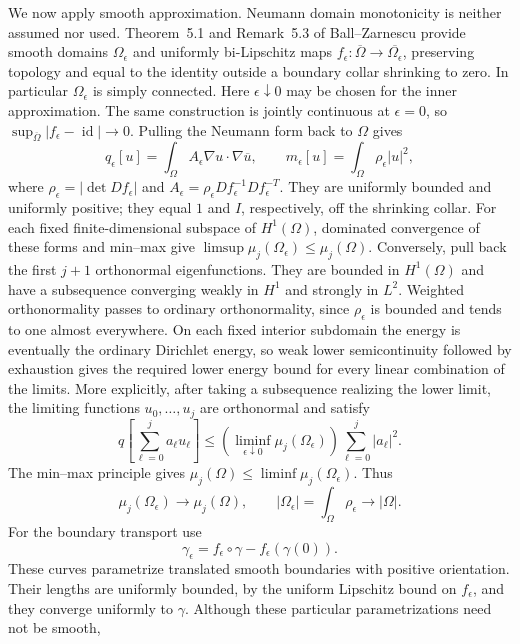 \documentclass[11pt]{amsart}
\numberwithin{equation}{section}
\begin{document}
We now apply smooth approximation. Neumann domain monotonicity is
neither assumed nor used. Theorem~5.1 and Remark~5.3 of
Ball--Zarnescu \cite{BZ} provide smooth domains $\Omega_\epsilon$ and
uniformly bi-Lipschitz maps $f_\epsilon:\overline\Omega\to
\overline{\Omega_\epsilon}$, preserving topology and equal to the identity
outside a boundary collar shrinking to zero. In particular
$\Omega_\epsilon$ is simply connected. Here $\epsilon\downarrow0$ may
be chosen for the inner approximation. The same construction is jointly
continuous at $\epsilon=0$, so
$\sup_{\overline\Omega}|f_\epsilon-\operatorname{id}|\to0$.
Pulling the Neumann form back to
$\Omega$ gives
\[
 q_\epsilon[u]=\int_\Omega A_\epsilon\nabla u\cdot\nabla\overline u,
 \qquad m_\epsilon[u]=\int_\Omega\rho_\epsilon|u|^2,
\]
where
$\rho_\epsilon=|\det Df_\epsilon|$ and
$A_\epsilon=\rho_\epsilon Df_\epsilon^{-1}Df_\epsilon^{-T}$.
They are uniformly bounded and uniformly positive; they equal $1$ and
$I$, respectively, off the shrinking collar.
For each fixed finite-dimensional subspace of $H^1(\Omega)$, dominated
convergence of these forms and min--max give
$\limsup\mu_j(\Omega_\epsilon)\le\mu_j(\Omega)$.
Conversely, pull back the first $j+1$ orthonormal eigenfunctions.
They are bounded in $H^1(\Omega)$ and have a subsequence converging
weakly in $H^1$ and strongly in $L^2$. Weighted orthonormality passes
to ordinary orthonormality, since $\rho_\epsilon$ is bounded and tends
to one almost everywhere. On each fixed interior subdomain the energy
is eventually the ordinary Dirichlet energy, so weak lower
semicontinuity followed by exhaustion gives the required lower energy
bound for every linear combination of the limits. More explicitly,
after taking a subsequence realizing the lower limit, the limiting
functions $u_0,\ldots,u_j$ are orthonormal and satisfy
\[
 q\!\left[\sum_{\ell=0}^j a_\ell u_\ell\right]
 \le \left(\liminf_{\epsilon\downarrow0}
                  \mu_j(\Omega_\epsilon)\right)
                  \sum_{\ell=0}^j|a_\ell|^2.
\]
The min--max principle gives
$\mu_j(\Omega)\le\liminf\mu_j(\Omega_\epsilon)$.
Thus
\[
 \mu_j(\Omega_\epsilon)\longrightarrow\mu_j(\Omega),\qquad
 |\Omega_\epsilon|=\int_\Omega\rho_\epsilon\longrightarrow|\Omega|.
\]
For the boundary transport use
\[
 \gamma_\epsilon=f_\epsilon\circ\gamma-f_\epsilon(\gamma(0)).
\]
These curves parametrize translated smooth boundaries with positive
orientation. Their lengths are uniformly bounded, by the uniform
Lipschitz bound on $f_\epsilon$, and they converge uniformly to $\gamma$.
Although these particular parametrizations need not be smooth,
\end{document}
